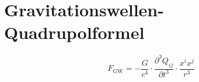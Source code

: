 \section{Gravitationswellen-Quadrupolformel}
\[ F_{\text{GW}} = -\frac{G}{c^4} \cdot \frac{\partial^3 Q_{ij}}{\partial t^3} \cdot \frac{x^i x^j}{r^3} \]